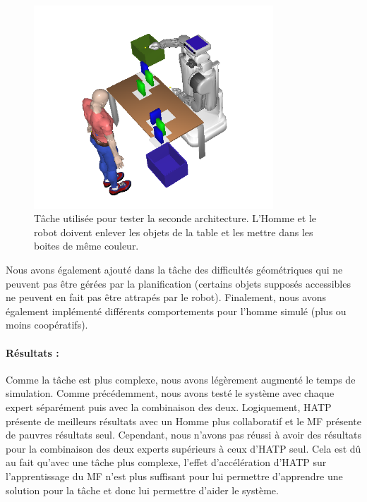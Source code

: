 \documentclass[english,a4paper,11pt,twoside]{StyleThese}
\begin{document}
\begin{figure}[!h]
	\centering
    \includegraphics[width=0.8\textwidth]{figs/Chapter7/InitSecondScenario1.png}
    \caption{Tâche utilisée pour tester la seconde architecture. L'Homme et le robot doivent enlever les objets de la table et les mettre dans les boites de même couleur.}
    \label{fig:SecondArchi}
\end{figure}

Nous avons également ajouté dans la tâche des difficultés géométriques qui ne peuvent pas être gérées par la planification (certains objets supposés accessibles ne peuvent en fait pas être attrapés par le robot). Finalement, nous avons également implémenté différents comportements pour l'homme simulé (plus ou moins coopératifs).

\paragraph{Résultats :}

Comme la tâche est plus complexe, nous avons légèrement augmenté le temps de simulation. Comme précédemment, nous avons testé le système avec chaque expert séparément puis avec la combinaison des deux. Logiquement, HATP présente de meilleurs résultats avec un Homme plus collaboratif et le MF présente de pauvres résultats seul. Cependant, nous n'avons pas réussi à avoir des résultats pour la combinaison des deux experts supérieurs à ceux d'HATP seul. Cela est dû au fait qu'avec une tâche plus complexe, l'effet d'accélération d'HATP sur l'apprentissage du MF n'est plus suffisant pour lui permettre d'apprendre une solution pour la tâche et donc lui permettre d'aider le système. 
\end{document}

